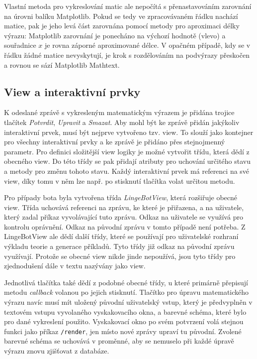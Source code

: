 \documentclass[FM]{tulthesis}
\begin{document}
	Vlastní metoda pro vykreslování matic ale nepočítá s přenastavováním zarovnání na úrovni balíku Matplotlib. Pokud se tedy ve zpracovávaném řádku nachází matice, pak je jeho levá část zarovnána pomocí metody pro aproximaci délky výrazu: Matplotlib zarovnání je ponecháno na výchozí hodnotě (vlevo) a souřadnice $x$ je rovna záporné aproximované délce. V opačném případě, kdy se v řádku žádné matice nevyskytují, je krok s rozdělováním na podvýrazy přeskočen a rovnou se sází Matplotlib Mathtext.
	
	\subsection{View a interaktivní prvky}
	
	K odeslané zprávě s vykresleným matematickým výrazem je přidána trojice tlačítek \textit{Potvrdit}, \textit{Upravit} a \textit{Smazat}. Aby mohl být ke zprávě přidán jakýkoliv interaktivní prvek, musí být nejprve vytvořeno tzv. view. To slouží jako kontejner pro všechny interaktivní prvky a ke zprávě je přidáno přes stejnojmenný parametr. Pro definici složitější view logiky je možné vytvořit třídu, která dědí z obecného view. Do této třídy se pak přidají atributy pro uchování určitého stavu a metody pro změnu tohoto stavu. Každý interaktivní prvek má referenci na své view, díky tomu v něm lze např. po stisknutí tlačítka volat určitou metodu.
	
	Pro případy bota byla vytvořena třída \textit{LingeBotView}, která rozšiřuje obecné view. Třída uchovává referenci na zprávu, ke které je přiřazena, a na uživatele, který zadal příkaz vyvolávající tuto zprávu. Odkaz na uživatele se využívá pro kontrolu oprávnění. Odkaz na původní zprávu v tomto případě není potřeba. Z \mbox{LingeBotView} ale dědí další třídy, které se používají pro uživatelské rozhraní výkladu teorie a generace příkladů. Tyto třídy již odkaz na původní zprávu využívají. Protože se obecné view nikde jinde nepoužívá, jsou tyto třídy pro zjednodušení dále v textu nazývány jako view. 
	
	Jednotlivá tlačítka také dědí z podobné obecné třídy, u které primárně přepisují metodu \textit{callback} volanou po jejich stisknutí. Tlačítko pro úpravu matematického výrazu navíc musí mít uložený původní uživatelský vstup, který je předvyplněn v textovém vstupu vyvolaného vyskakovacího okna, a barevné schéma, které bylo pro dané vykreslení použito. Vyskakovací okno po svém potvrzení volá stejnou funkci jako příkaz \verb|/render|, jen místo nové zprávy upraví tu původní. Zvolené barevné schéma se uchovává v proměnné, aby se nemuselo při každé úpravě výrazu znovu zjišťovat z databáze.
			
\end{document}
